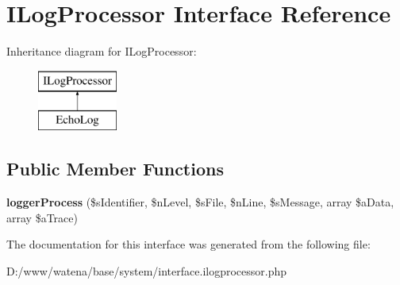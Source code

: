 \hypertarget{interface_i_log_processor}{\section{I\-Log\-Processor Interface Reference}
\label{interface_i_log_processor}
}
Inheritance diagram for I\-Log\-Processor\-:\begin{figure}[H]
\begin{center}
\leavevmode
\includegraphics[height=2.000000cm]{interface_i_log_processor}
\end{center}
\end{figure}
\subsection*{Public Member Functions}
\begin{DoxyCompactItemize}
\item 
\hypertarget{interface_i_log_processor_a2ec834d1dbbc4027ef9efa8132c3df52}{{\bfseries logger\-Process} (\$s\-Identifier, \$n\-Level, \$s\-File, \$n\-Line, \$s\-Message, array \$a\-Data, array \$a\-Trace)}\label{interface_i_log_processor_a2ec834d1dbbc4027ef9efa8132c3df52}

\end{DoxyCompactItemize}


The documentation for this interface was generated from the following file\-:\begin{DoxyCompactItemize}
\item 
D\-:/www/watena/base/system/interface.\-ilogprocessor.\-php\end{DoxyCompactItemize}
